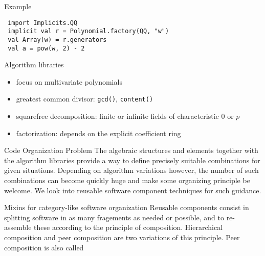 \documentclass[final]{beamer}
\newcommand{\code}[1]{\texttt{#1}}
\begin{document}
\begin{frame}[fragile]
\begin{columns}[t]
\begin{column}{.3\linewidth}
  \begin{block}{\large Example}
\tiny 
\begin{lstlisting} 
 import Implicits.QQ
 implicit val r = Polynomial.factory(QQ, "w")
 val Array(w) = r.generators
 val a = pow(w, 2) - 2 
\end{lstlisting} 
  \end{block}
  \hfill
  \begin{block}{\large Algorithm libraries}
  \scriptsize 
  \begin{itemize}
  \item focus on multivariate polynomials
  \item greatest common divisor: \code{gcd()}, \code{content()}
  \item squarefree decomposition: finite or infinite fields of characteristic 0 or $p$
  \item factorization: depends on the explicit coefficient ring
  \end{itemize}
  \end{block}
  \hfill
  \begin{block}{\large Code Organization Problem}
  \scriptsize
The algebraic structures and elements together with the algorithm
libraries provide a way to define precisely suitable combinations
for given situations. Depending on algorithm variations however,
the number of such combinations can become quickly huge and make
some organizing principle be welcome. We look into reusable
software component techniques for such guidance.
  \end{block}
  \hfill
  \begin{block}{\large Mixins for category-like software organization}
{\scriptsize %
Reusable components consist in splitting software in as many fragements
as needed or possible, and to re-assemble these according to the
principle of composition. Hierarchical composition and peer composition
are two variations of this principle. Peer composition is also called
}
\end{block}
\end{column}
\end{columns}
\end{frame}
\end{document}
